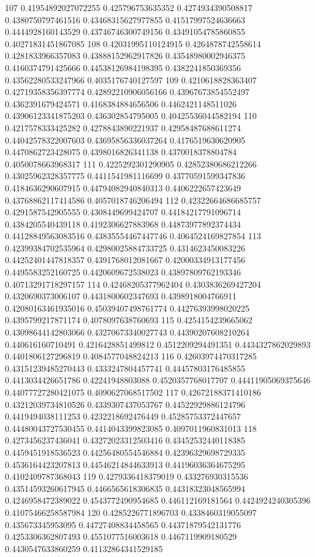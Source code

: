 107 0.41954892027072255 0.425796753635352 0.4274934390508817 0.4380750797461516 0.43468315627977855 0.41517997524636663 0.4444928160143529 0.43746746300749156 0.43491054785860855 0.40271831451867085
108 0.42031995110124915 0.4264878742558614 0.4281833966357083 0.43888152962917826 0.43548980002946375 0.4160374791425666 0.44538126984198395 0.4382241850369356 0.43562280533247966 0.4035176740127597
109 0.4210618828363407 0.42719358356397774 0.42892210906056166 0.43967673854552497 0.4362391679424571 0.4168384884656506 0.4462421148511026 0.43906123341875203 0.436302854795005 0.40425536044582194
110 0.4217578333425282 0.4278843890221937 0.42958487688611274 0.44042578322007603 0.43695856336037264 0.4176519630620905 0.4470862723428075 0.4398016826341138 0.4370018378804784 0.4050078663968317
111 0.4225292301290905 0.42852380686212266 0.43025962328357775 0.4411541981116699 0.43770591599347836 0.4184636290607915 0.44794082940840313 0.4406222657423649 0.43768862117414586 0.4057018746206494
112 0.42322664686685757 0.4291587542905555 0.4308449699424707 0.44184217791096714 0.4384205540439118 0.4192306627883968 0.44873977892374434 0.44128849563083516 0.43835554467447746 0.4064524169827854
113 0.42399384702535964 0.42980025884733725 0.4314623450083226 0.44252401447818357 0.4391768012081667 0.42000334913177456 0.4495583252160725 0.4420609672538023 0.43897809762193346 0.40713291718297157
114 0.42468205377962404 0.4303836269427204 0.4320690373006107 0.4431800602347693 0.4398918004766911 0.42080163461935016 0.45039407498761774 0.44276393998020225 0.4395799217871174 0.4078097638760693
115 0.4254154239665062 0.43098644142803066 0.43270673340027743 0.44390207608210264 0.440616160710491 0.4216428851499812 0.4512209294491351 0.4434327862029893 0.4401806127296819 0.4084577048824213
116 0.42603974470317285 0.43151239485270443 0.4333247804457741 0.44457803176485855 0.4413034426651786 0.42241948803088 0.4520357768017707 0.44411905069375646 0.44077727280421075 0.4090627068517502
117 0.42672188371410186 0.43212039734810526 0.4339307437053767 0.44522929886124796 0.4419494038111253 0.4232218692476449 0.45285753372447657 0.44480043727530455 0.4414043399823085 0.4097011960831013
118 0.4273456237436041 0.43272023312503416 0.43452532440118385 0.4459451918536523 0.44256480554546884 0.42396329698729335 0.4536164423207813 0.44546214844633913 0.44196036364675295 0.4102409787368043
119 0.4279336418379019 0.433276930315536 0.43514593260617945 0.4466565618306835 0.44318323048565994 0.4246958472389022 0.4543772490954685 0.446112169181564 0.4424924240305396 0.41075466258587984
120 0.4285226771896703 0.4338460319055097 0.435673345953095 0.44727408834458565 0.44371879542131776 0.4253306362807493 0.4551077516003618 0.4467119909180529 0.4430547633860259 0.41132864341529185
